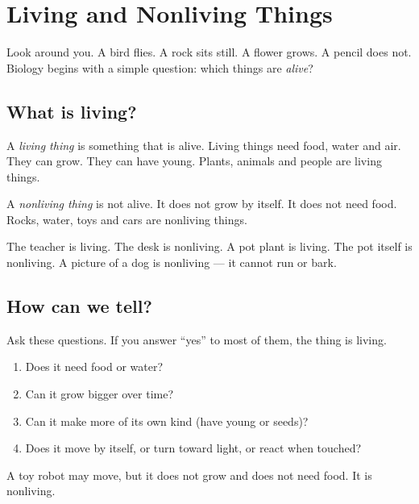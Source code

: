 \chapter{Living and Nonliving Things}\label{ch:g1:living-nonliving}

Look around you. A bird flies. A rock sits still. A flower grows. A
pencil does not. Biology begins with a simple question: which things
are \emph{alive}?

\section{What is living?}

\begin{definition}\label{def:g1:living-nonliving:living}
A \emph{living thing} is something that is
alive. Living things need food, water and air. They can grow. They
can have young. Plants, animals and people are living things.
\end{definition}

\begin{definition}\label{def:g1:living-nonliving:nonliving}
A \emph{nonliving thing} is not alive. It
does not grow by itself. It does not need food. Rocks, water, toys
and cars are nonliving things.
\end{definition}


\begin{example}\label{ex:g1:living-nonliving:class}
The teacher is living. The desk is nonliving. A pot plant is living.
The pot itself is nonliving. A picture of a dog is nonliving --- it
cannot run or bark.
\end{example}

\section{How can we tell?}

\begin{method}[Is it living?]\label{met:g1:living-nonliving:test}
Ask these questions. If you answer ``yes'' to most of them, the
thing is living.
\begin{enumerate}
  \item Does it need food or water?
  \item Can it grow bigger over time?
  \item Can it make more of its own kind (have young or seeds)?
  \item Does it move by itself, or turn toward light, or react when
        touched?
\end{enumerate}
A toy robot may move, but it does not grow and does not need food.
It is nonliving.
\end{method}

